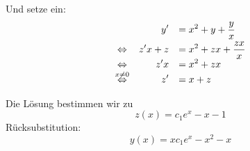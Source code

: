 \documentclass[main.tex]{subfiles}
\begin{document}
Und setze ein:
\[\everymath={\displaystyle}\begin{array}{crl}
    & y' &= x^2 + y + \frac{y}{x} \\[2mm]
\Leftrightarrow & z'x + z &= x^2 + z x + \frac{z x}{x} \\
\Leftrightarrow & z'x &= x^2 + z x \\
\overset{x\neq 0}{\Leftrightarrow} & z' &= x + z \\
\end{array}\]

Die Lösung bestimmen wir zu
$$
    z(x) = c_1 e^x - x - 1
$$
Rücksubstitution:
$$
    y(x) = x c_1 e^x - x^2 - x
$$
\end{document}
